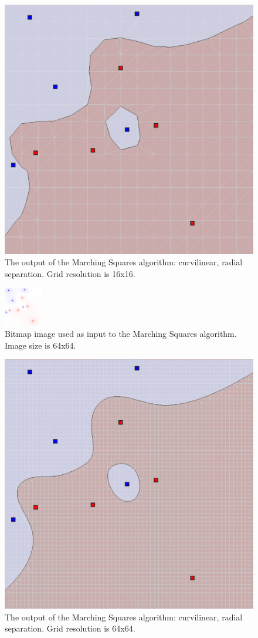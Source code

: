 \documentclass[12pt]{article}
\begin{document}
\begin{figure} 
\centering
  \includegraphics[width = 3 in]{16_res.png}
  \caption{The output of the Marching Squares algorithm: curvilinear, radial separation. Grid resolution is 16x16.
}
\end{figure}



\begin{figure} 
\centering
  \includegraphics[width = 3 in]{64_res_image.png}
  \caption{Bitmap image used as input to the Marching Squares algorithm. 
Image size is 64x64.
}
\end{figure}

\begin{figure} 
\centering
  \includegraphics[width = 3 in]{64_res.png}
  \caption{The output of the Marching Squares algorithm: curvilinear, radial separation. Grid resolution is 64x64.
}
\end{figure}
\end{document}
